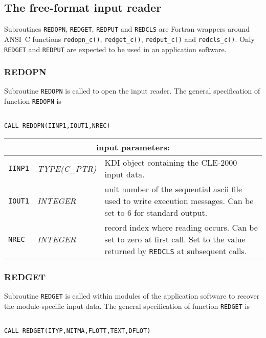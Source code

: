 \vskip 0.8cm

\subsection {The free-format input reader}

Subroutines {\tt REDOPN}, {\tt REDGET}, {\tt REDPUT} and {\tt REDCLS} are Fortran wrappers around ANSI~C functions {\tt redopn\_c()}, {\tt redget\_c()}, {\tt redput\_c()} and {\tt redcls\_c()}.
Only {\tt REDGET} and {\tt REDPUT} are expected to be used in an application software.

\subsubsection{REDOPN}

Subroutine {\tt REDOPN} is called to open the input reader. The general specification of function {\tt REDOPN} is

\begin{verbatim}

CALL REDOPN(IINP1,IOUT1,NREC)
\end{verbatim}

\vskip 0.8cm

\noindent
\begin{tabular}{|p{1.5cm}|p{2.5cm}|p{10.5cm}|}
\hline
\multicolumn{3}{|c|}{\bf input parameters:} \\
\hline
{\tt IINP1} & {\it TYPE(C\_PTR)} & KDI object containing the CLE-2000 input data.\\
\hline
{\tt IOUT1} & {\it INTEGER} & unit number of the sequential {\sc ascii} file used to write execution messages. Can be set to 6 for standard output. \\
\hline
{\tt NREC} & {\it INTEGER} & record index where reading occurs. Can be set to zero at first call. Set to the value returned by {\tt REDCLS} at subsequent calls.\\
\hline
\end{tabular}

\subsubsection{REDGET}

Subroutine {\tt REDGET} is called within modules of the application software to recover the module-specific input data.
The general specification of function {\tt REDGET} is

\begin{verbatim}

CALL REDGET(ITYP,NITMA,FLOTT,TEXT,DFLOT)
\end{verbatim}

